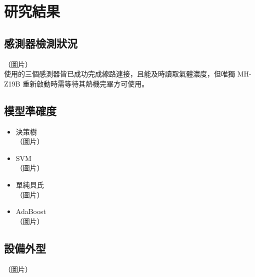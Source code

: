 \chapter{研究結果}

\section{感測器檢測狀況}
（圖片）\\
使用的三個感測器皆已成功完成線路連接，且能及時讀取氣體濃度，但唯獨 MH-Z19B 重新啟動時需等待其熱機完畢方可使用。

\section{模型準確度}
\begin{itemize}
	\item 決策樹\\
	（圖片）\\
	\item SVM\\
	（圖片）\\
	\item 單純貝氏\\
	（圖片）\\
	\item AdaBoost\\
	（圖片）\\
\end{itemize}

\section{設備外型}
（圖片）\\